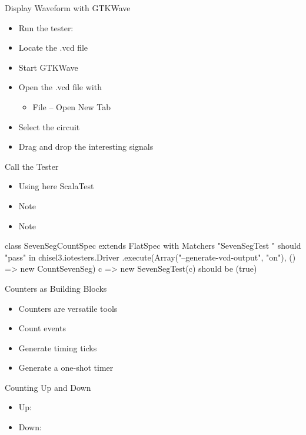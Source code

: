 \begin{frame}[fragile]{Display Waveform with GTKWave}
\begin{itemize}
\item Run the tester: 
\item Locate the .vcd file
\item Start GTKWave
\item Open the .vcd file with
\begin{itemize}
\item File -- Open New Tab
\end{itemize}
\item Select the circuit
\item Drag and drop the interesting signals
\end{itemize}
\end{frame}



\begin{frame}[fragile]{Call the Tester}
\begin{itemize}
\item Using here ScalaTest
\item Note 
\item Note 
\end{itemize}
\begin{chisel}
class SevenSegCountSpec extends
  FlatSpec with Matchers {
  "SevenSegTest " should "pass" in {
  chisel3.iotesters.Driver
  .execute(Array("--generate-vcd-output", "on"),
    () => new CountSevenSeg)
    { c => new SevenSegTest(c)} should be (true) }
}
\end{chisel}
\end{frame}




\begin{frame}[fragile]{Counters as Building Blocks}
\begin{itemize}
\item Counters are versatile tools
\item Count events
\item Generate timing ticks
\item Generate a one-shot timer
\end{itemize}
\end{frame}

\begin{frame}[fragile]{Counting Up and Down}
\begin{itemize}
\item Up:
\item Down:
\end{itemize}
\end{frame}

